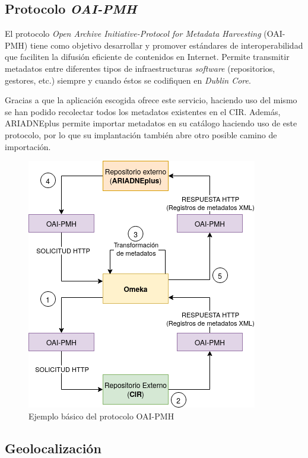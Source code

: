 \documentclass[
]{article}
\begin{document}
\hypertarget{protocolo-oai-pmh}{%
\subsection{\texorpdfstring{Protocolo
\emph{OAI-PMH}}{Protocolo OAI-PMH}}\label{protocolo-oai-pmh}}

El protocolo \emph{Open Archive Initiative-Protocol for Metadata
Harvesting} (OAI-PMH) tiene como objetivo desarrollar y promover
estándares de interoperabilidad que faciliten la difusión eficiente de
contenidos en Internet. Permite transmitir metadatos entre diferentes
tipos de infraestructuras \emph{software} (repositorios, gestores, etc.)
siempre y cuando éstos se codifiquen en \emph{Dublin Core}.

Gracias a que la aplicación escogida ofrece este servicio, haciendo uso
del mismo se han podido recolectar todos los metadatos existentes en el
CIR. Además, ARIADNEplus permite importar metadatos en su catálogo
haciendo uso de este protocolo, por lo que su implantación también abre
otro posible camino de importación.

\begin{figure}
\centering
\includegraphics{../_static/images/oai-pmh.png}
\caption{Ejemplo básico del protocolo OAI-PMH}
\end{figure}

\hypertarget{geolocalizaciuxf3n}{%
\subsection{Geolocalización}\label{geolocalizaciuxf3n}}
\end{document}
